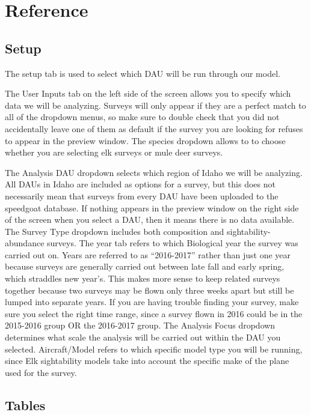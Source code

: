 \documentclass[
]{book}
\begin{document}
\hypertarget{sight-ref}{%
\section{Reference}\label{sight-ref}}

\hypertarget{sight-setup}{%
\subsection{Setup}\label{sight-setup}}

The setup tab is used to select which {DAU} will be run through our model.

The User Inputs tab on the left side of the screen allows you to specify which data we will be analyzing. Surveys will only appear if they are a perfect match to all of the dropdown menus, so make sure to double check that you did not accidentally leave one of them as default if the survey you are looking for refuses to appear in the preview window. The species dropdown allows to to choose whether you are selecting elk surveys or mule deer surveys.

The Analysis DAU dropdown selects which region of Idaho we will be analyzing. All DAUs in Idaho are included as options for a survey, but this does not necessarily mean that surveys from every DAU have been uploaded to the speedgoat database. If nothing appears in the preview window on the right side of the screen when you select a DAU, then it means there is no data available. The Survey Type dropdown includes both {composition} and {sightability-abundance} surveys. The year tab refers to which Biological year the survey was carried out on. Years are referred to as ``2016-2017'' rather than just one year because surveys are generally carried out between late fall and early spring, which straddles new year's. This makes more sense to keep related surveys together because two surveys may be flown only three weeks apart but still be lumped into separate years. If you are having trouble finding your survey, make sure you select the right time range, since a survey flown in 2016 could be in the 2015-2016 group OR the 2016-2017 group. The Analysis Focus dropdown determines what scale the analysis will be carried out within the DAU you selected. Aircraft/Model refers to which specific model type you will be running, since Elk sightability models take into account the specific make of the plane used for the survey.

\hypertarget{sight-table}{%
\subsection{Tables}\label{sight-table}}
\end{document}
